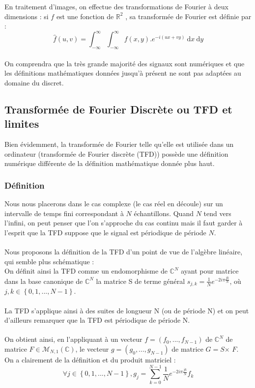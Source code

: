 En traitement d'images, on effectue des transformations de Fourier à deux dimensions : si $f$ est une fonction de $\mathbb{R}^2$ , sa transformée de Fourier est définie par : $$\hat{f}(u,v)=\int_{-\infty}^{\infty}\int_{-\infty}^{\infty}f(x,y).e^{-i(ux+vy)}\:\mathrm{d}x\:\mathrm{d}y$$
\\
On comprendra que la très grande majorité des signaux sont numériques et que les définitions mathématiques données jusqu'à présent ne sont pas adaptées au domaine du discret.

\subsection{Transformée de Fourier Discrète ou TFD et limites}

Bien évidemment, la transformée de Fourier telle qu'elle est utilisée dans un ordinateur (transformée de Fourier discrète (TFD)) possède une définition numérique différente de la définition mathématique donnée plus haut. 

\subsubsection{Définition}

Nous nous placerons dans le cas complexe (le cas réel en découle) sur un intervalle de temps fini correspondant à $N$ échantillons. Quand $N$ tend vers l'infini, on peut penser que l'on s'approche du cas continu mais il faut garder à l'esprit que la TFD suppose que le signal est périodique de période $N$.
\\ \\
Nous proposons la définition de la TFD d'un point de vue de l'algèbre linéaire, qui semble plus schématique :
\\
On définit ainsi la TFD comme un endomorphisme de $\mathbb{C}^N$ ayant pour matrice dans la base canonique de $\mathbb{C}^N$ la matrice S de terme général $s_{j,k}=\displaystyle{\frac{1}{N}e^{-2i\pi \frac{jk}{N}}}$, où $j,k\in \left\{0,1,...,N-1\right\}$. 
\\ \\
La TFD s'applique ainsi à des suites de longueur N (ou de période N) et on peut d'ailleurs remarquer que la TFD est périodique de période N.
\\ \\
On obtient ainsi, en l'appliquant à un vecteur $f=(f_0,...,f_{N-1})$ de $\mathbb{C}^N$ de matrice $F\in \mathcal{M}_{N,1}(\mathbb{C})$, le vecteur $g=(g_0,...,g_{N-1})$ de matrice $G=S$$\times$ $F$.
\\ On a clairement de la définition et du produit matriciel : 
$$\forall j\in \left\{0,1,...,N-1\right\}, g_j=\displaystyle\sum_{k=0}^{N-1}\displaystyle{\frac{1}{N}e^{-2i\pi \frac{jk}{N}}}f_k$$

